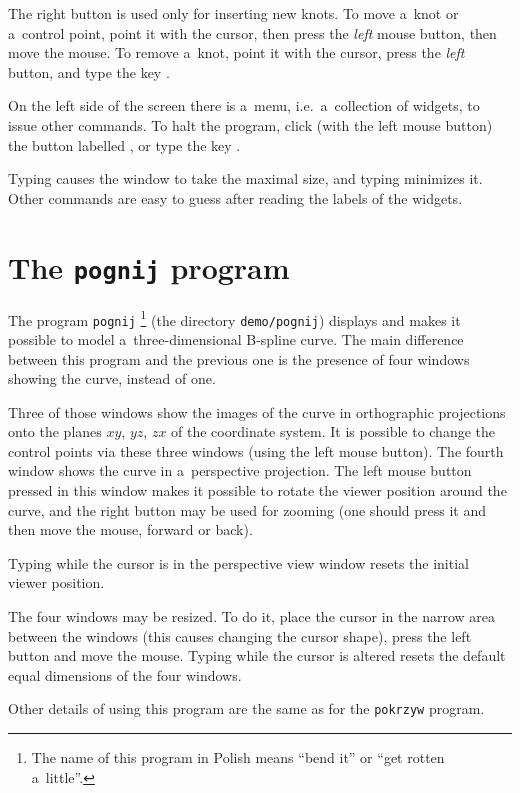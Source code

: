 The right button is used only for inserting new knots. To move a~knot
or a~control point, point it with the cursor, then press the \emph{left}
mouse button, then move the mouse. To remove a~knot, point it with the cursor,
press the \emph{left} button, and type the key .

On the left side of the screen there is a~menu, i.e.\ a~collection of
widgets, to issue other commands. To halt the program, click
(with the left mouse button) the button labelled ,
or type the key .

Typing  causes the window to take the maximal size,
and typing  minimizes it. Other commands are easy
to guess after reading the labels of the widgets.


\section{The \texttt{pognij} program}

The program \texttt{pognij}%
\footnote{The name of this program in Polish means ``bend it'' or
``get rotten a~little''.}
(the directory \texttt{demo/pognij}) displays and makes it possible to
model a~three-dimensional B-spline curve. The main difference between
this program and the previous one is the presence of four windows
showing the curve, instead of one.

Three of those windows show the images of the curve in orthographic
projections onto the planes $xy$, $yz$, $zx$ of the coordinate system.
It is possible to change the control points via these three windows
(using the left mouse button).
The fourth window shows the curve in a~perspective projection.
The left mouse button pressed in this window makes it possible to
rotate the viewer position around the curve, and the right button
may be used for zooming (one should press it and then move
the mouse, forward or back).

Typing  while the cursor is in the perspective
view window resets the initial viewer position.

The four windows may be resized. To do it, place the cursor in the narrow
area between the windows (this causes changing the cursor shape), press
the left button and move the mouse. Typing  while the
cursor is altered resets the default equal dimensions of the four windows.

Other details of using this program are the same as for the
\texttt{pokrzyw} program.


